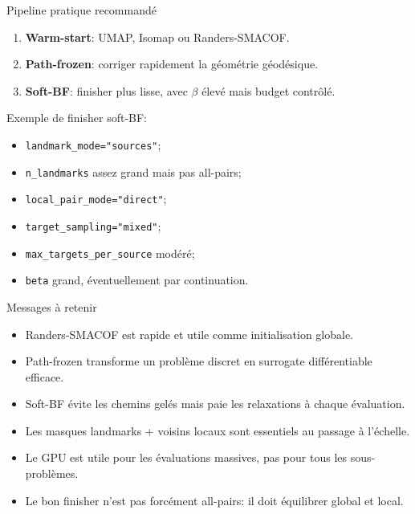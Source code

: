 \documentclass[aspectratio=169]{beamer}
\begin{document}
\begin{frame}{Pipeline pratique recommandé}
  \begin{enumerate}
    \item \textbf{Warm-start}: UMAP, Isomap ou Randers-SMACOF.
    \item \textbf{Path-frozen}: corriger rapidement la géométrie géodésique.
    \item \textbf{Soft-BF}: finisher plus lisse, avec $\beta$ élevé mais budget contrôlé.
  \end{enumerate}

  \vspace{0.3cm}
  Exemple de finisher soft-BF:
  \begin{itemize}
    \item \texttt{landmark\_mode="sources"};
    \item \texttt{n\_landmarks} assez grand mais pas all-pairs;
    \item \texttt{local\_pair\_mode="direct"};
    \item \texttt{target\_sampling="mixed"};
    \item \texttt{max\_targets\_per\_source} modéré;
    \item \texttt{beta} grand, éventuellement par continuation.
  \end{itemize}
\end{frame}

\begin{frame}{Messages à retenir}
  \begin{itemize}
    \item Randers-SMACOF est rapide et utile comme initialisation globale.
    \item Path-frozen transforme un problème discret en surrogate différentiable efficace.
    \item Soft-BF évite les chemins gelés mais paie les relaxations à chaque évaluation.
    \item Les masques landmarks + voisins locaux sont essentiels au passage à l'échelle.
    \item Le GPU est utile pour les évaluations massives, pas pour tous les sous-problèmes.
    \item Le bon finisher n'est pas forcément all-pairs: il doit équilibrer global et local.
  \end{itemize}
\end{frame}
\end{document}
